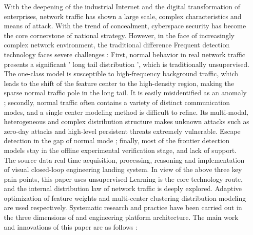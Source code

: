 \begin{eabstract}
    \thispagestyle{plain}
    With the deepening of the industrial Internet and the digital transformation of enterprises, network traffic has shown a large scale, complex characteristics and means of attack. 
    With the trend of concealment, cyberspace security has become the core cornerstone of national strategy. However, in the face of increasingly complex network environment, the traditional difference 
    Frequent detection technology faces severe challenges : First, normal behavior in real network traffic presents a significant ' long tail distribution ', which is traditionally unsupervised. 
    The one-class model is susceptible to high-frequency background traffic, which leads to the shift of the feature center to the high-density region, making the sparse normal traffic pole in the long tail. 
    It is easily misidentified as an anomaly ; secondly, normal traffic often contains a variety of distinct communication modes, and a single center modeling method is difficult to refine. 
    Its multi-modal, heterogeneous and complex distribution structure makes unknown attacks such as zero-day attacks and high-level persistent threats extremely vulnerable. 
    Escape detection in the gap of normal mode ; finally, most of the frontier detection models stay in the offline experimental verification stage, and lack of support. 
    The source data real-time acquisition, processing, reasoning and implementation of visual closed-loop engineering landing system. In view of the above three key pain points, this paper uses unsupervised 
    Learning is the core technology route, and the internal distribution law of network traffic is deeply explored. Adaptive optimization of feature weights and multi-center clustering distribution modeling are used respectively. 
    Systematic research and practice have been carried out in the three dimensions of  and engineering platform architecture. The main work and innovations of this paper are as follows :


\end{eabstract}
